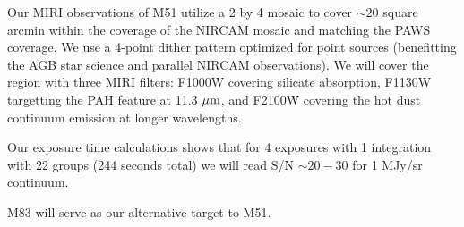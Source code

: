\documentclass[12pt]{article}
\begin{document}
\vspace{0.1in}

  Our MIRI observations of M51 utilize a 2 by 4 mosaic to cover $\sim20$ square arcmin within the coverage of the NIRCAM mosaic and matching the PAWS coverage.  We use a 4-point dither pattern optimized for point sources (benefitting the AGB star science and parallel NIRCAM observations).  We will cover the region with three MIRI filters: F1000W covering silicate absorption, F1130W targetting the PAH feature at 11.3 $\hbox{$\mu$m}$, and F2100W covering the hot dust continuum emission at longer wavelengths.

Our exposure time calculations shows that for 4 exposures with 1 integration with 22 groups (244 seconds total) we will read S/N $\sim20-30$ for 1 MJy/sr continuum. 

\vspace{0.1in}


\vspace{0.1in}


\vspace{0.in}



%

\alttargets   %
M83 will serve as our alternative target to M51.  


%
\end{document}
